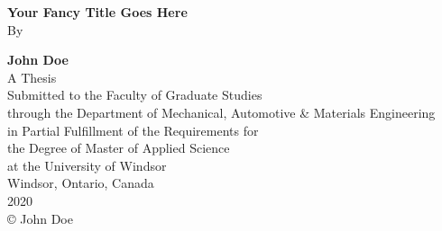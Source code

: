 \documentclass[12pt,letterpaper,oneside]{report}
\begin{document}

\newpage %
\pagestyle{empty} %
{\centering
	\vspace{4cm}
	{\large\bfseries Your Fancy Title Goes Here\\}
	\vspace{1cm}
	By\par
	\vspace{1cm}
	{\bfseries John Doe\\}
	\vfill
	A Thesis \\
	Submitted to the Faculty of Graduate Studies \\
	through the Department of Mechanical, Automotive \& Materials Engineering\\
	in Partial Fulfillment of the Requirements for\\
	the Degree of Master of Applied Science\\
	at the University of Windsor\\
	\vfill
	Windsor, Ontario, Canada\\
	\vspace{1cm}
	2020\\
	\vspace{1cm}
	\copyright {} John Doe\\
}
\end{document}
